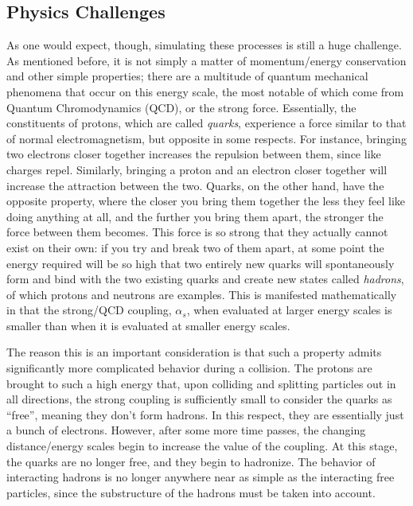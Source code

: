 \subsection{Physics Challenges}\label{sec:Sim-Considerations}

As one would expect, though, simulating these processes is still a huge challenge. As mentioned before, it is not simply a matter of momentum/energy conservation and other simple properties; there are a multitude of quantum mechanical phenomena that occur on this energy scale, the most notable of which come from Quantum Chromodynamics (QCD), or the strong force. Essentially, the constituents of protons, which are called \textit{quarks}, experience a force similar to that of normal electromagnetism, but opposite in some respects. For instance, bringing two electrons closer together increases the repulsion between them, since like charges repel. Similarly, bringing a proton and an electron closer together will increase the attraction between the two. Quarks, on the other hand, have the opposite property, where the closer you bring them together the less they feel like doing anything at all, and the further you bring them apart, the stronger the force between them becomes. This force is so strong that they actually cannot exist on their own: if you try and break two of them apart, at some point the energy required will be so high that two entirely new quarks will spontaneously form and bind with the two existing quarks and create new states called \textit{hadrons}, of which protons and neutrons are examples. This is manifested mathematically in that the strong/QCD coupling, $\alpha_s$, when evaluated at larger energy scales is smaller than when it is evaluated at smaller energy scales.

The reason this is an important consideration is that such a property admits significantly more complicated behavior during a collision. The protons are brought to such a high energy that, upon colliding and splitting particles out in all directions, the strong coupling is sufficiently small to consider the quarks as ``free'', meaning they don't form hadrons. In this respect, they are essentially just a bunch of electrons. However, after some more time passes, the changing distance/energy scales begin to increase the value of the coupling. At this stage, the quarks are no longer free, and they begin to hadronize. The behavior of interacting hadrons is no longer anywhere near as simple as the interacting free particles, since the substructure of the hadrons must be taken into account. 

